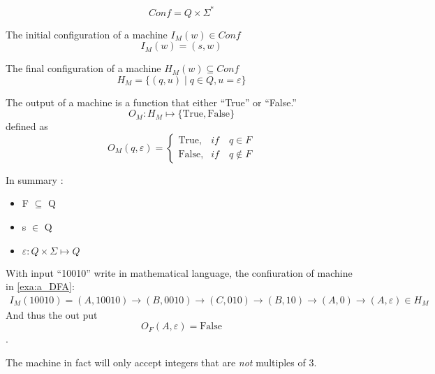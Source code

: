 
\begin{definition}[Configuration]
    \[
        Conf = Q \times \Sigma^*
    \]
\end{definition}

\begin{definition}
    The initial configuration of a machine $I_M(w) \in Conf$
    \[
        I_M(w) = (s,w)
    \]
\end{definition}

\begin{definition}
    The final configuration of a machine $H_M(w) \subseteq Conf$
    \[
        H_M = \{ (q,u) \mid q \in Q, u = \varepsilon \} 
    \]
\end{definition}

\begin{definition}
The output of a machine is a function that either ``True'' or ``False.''
    \[
        O_M: H_M \mapsto \{\text {True}, \text {False}\}
    \]
    defined as
    \[
        O_M(q,\varepsilon)
        = \begin{cases}
            \text{True},  & if \quad q \in F \\
            \text{False}, & if \quad q \notin F
        \end{cases}
    \]
\end{definition}

In summary $\colon$
\begin{itemize}
\item F $\subseteq$ Q
\item s $\in$ Q
\item $\varepsilon: Q \times \Sigma \mapsto Q$
\end{itemize}

\begin{example} 
    With input ``10010'' write in mathematical language, the confiuration of machine in
    \autoref{exa:a_DFA}:
    \begin{align*}
        I_M(10010) 
        = (A,10010)
        \rightarrow      (B,0010)
        \rightarrow      (C,010)
        \rightarrow      (B,10)
        \rightarrow      (A,0)
        \rightarrow      (A, \varepsilon) \in H_M
    \end{align*}
    And thus the out put 
    \[
        O_F(A,\varepsilon) = \text{False}
    \].

    The machine in fact will only accept integers that are \emph{not} multiples of 3.
\end{example}


